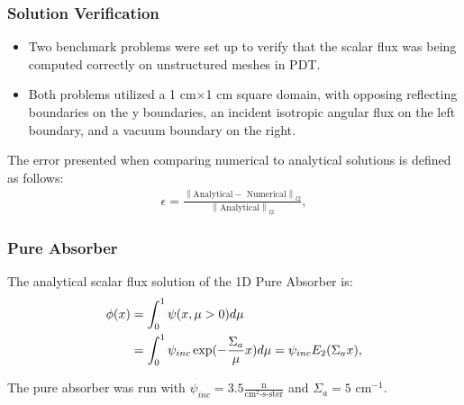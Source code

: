 \documentclass[]{beamer}
\newcommand{\norm}[1]{\left\lVert#1\right\rVert}
\begin{document}
\begin{frame}[t]\frametitle{Solution Verification}
\begin{block}{}
\begin{itemize}
\item Two benchmark problems were set up to verify that the scalar flux was being computed correctly on unstructured meshes in PDT.
\item Both problems utilized a 1 cm$\times$1 cm square domain, with opposing reflecting boundaries on the y boundaries, an incident isotropic angular flux on the left boundary, and a vacuum boundary on the right.
\end{itemize}
\end{block}
\begin{block}{}
The error presented when comparing numerical to analytical solutions is defined as follows:
\begin{align*}
\epsilon = \frac{\norm{\text{Analytical} - \text{ Numerical}}_{l2}}{\norm{\text{Analytical}}_{l2}},
\end{align*}
\end{block}
\end{frame}

\begin{frame}[t]\frametitle{Pure Absorber}
\begin{block}{}
The analytical scalar flux solution of the 1D Pure Absorber is:
\begin{align*}
\phi(x) &= \int_{0}^{1}\psi(x,\mu>0) d\mu \notag \\
&= \int_{0}^{1}\psi_{inc}\exp(-\frac{\Sigma_a}{\mu} x) d\mu = \psi_{inc} E_{2}(\Sigma_a x),
\end{align*}
\end{block}
\begin{block}{}
The pure absorber was run with $\psi_{inc} = 3.5 \frac{\text{n}}{\text{cm}^2\text{-s-ster}}$ and $\Sigma_a = 5 \text{ cm}^{-1}$.
\end{block}
\end{frame}
\end{document}
